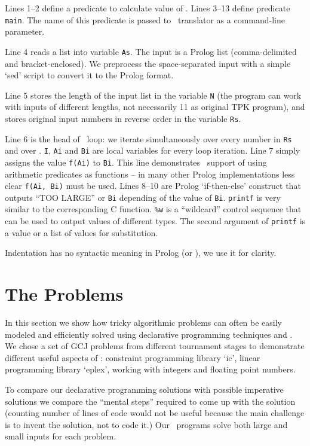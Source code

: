 \documentclass{acm_proc_article-sp}
\begin{document}
Lines 1--2 define a predicate to calculate value of . 
Lines 3--13 define predicate \texttt{main}.  
The name of this predicate is passed to \eclipse\ translator as a command-line parameter.

Line 4 reads a list into variable \texttt{As}.
The input is a Prolog list (comma-delimited and bracket-enclosed).
We preprocess the space-separated input with a simple `sed' script to convert it to the Prolog format.

Line 5 stores the length of the input list in the variable \texttt{N} (the program can work with inputs of different lengths, not necessarily 11 as original TPK program),
and stores original input numbers in reverse order in the variable \texttt{Rs}.

Line 6 is the head of \eclipse\ loop: we iterate simultaneously over every number in \texttt{Rs} and over . 
\texttt{I}, \texttt{Ai} and \texttt{Bi} are local variables for every loop iteration.
Line 7 simply assigns the value \texttt{f(Ai)} to \texttt{Bi}. 
This line demonstrates \eclipse\ support of using arithmetic predicates as functions -- in many other Prolog implementations less clear \texttt{f(Ai, Bi)} must be used.
Lines 8--10 are Prolog `if-then-else' construct that outputs ``TOO LARGE'' or \texttt{Bi} depending of the value of \texttt{Bi}.
\texttt{printf} is very similar to the corresponding C function. \texttt{\%w} is a ``wildcard'' control sequence that can be used to output values of different types.
The second argument of \texttt{printf} is a value or a list of values for substitution.

Indentation has no syntactic meaning in Prolog (or \eclipse), we use it for clarity.

\section{The Problems}

In this section we show how tricky algorithmic problems can often be easily modeled and efficiently solved using declarative programming techniques and \eclipse.
We chose a set of GCJ problems from different tournament stages to demonstrate different useful aspects of \eclipse: constraint programming library `ic', 
linear programming library `eplex', working with integers and floating point numbers.

To compare our declarative programming solutions with possible imperative solutions we compare the ``mental steps'' required to come up with the solution
(counting number of lines of code would not be useful because the main challenge is to invent the solution, not to code it.) 
Our \eclipse\ programs solve both large and small inputs for each problem.
\end{document}
